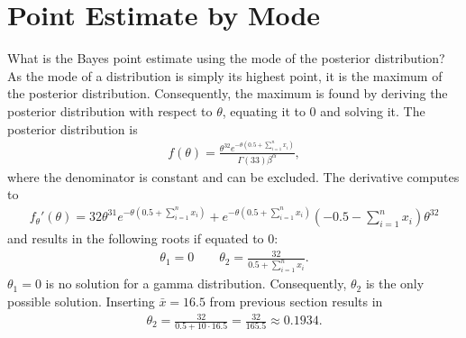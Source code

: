 \section{Point Estimate by Mode}
What is the Bayes point estimate using the mode of the posterior distribution?
As the mode of a distribution is simply its highest point, it is the maximum of the posterior distribution. Consequently, the maximum is found by deriving the posterior distribution with respect to $\theta$, equating it to 0 and solving it. The posterior distribution is
\begin{equation}
\begin{split}
f(\theta) = \frac{\theta^{32}e^{-\theta(0.5+\sum_{i=1}^n x_i)}}
{\Gamma(33)\beta^\alpha},
\end{split}
\label{eq:postdistinserted}
\end{equation}
where the denominator is constant and can be excluded. The derivative computes to
\begin{equation}
\begin{split}
f_\theta'(\theta) = 32\theta^{31}e^{-\theta\left(0.5+\sum_{i=1}^n x_i\right)}+e^{-\theta\left(0.5+\sum_{i=1}^n x_i\right)}\left(-0.5-\sum_{i=1}^n x_i\right)\theta^{32}
\end{split}
\label{eq:postdistderived}
\end{equation}
and results in the following roots if equated to 0:
\begin{equation}
\begin{split}
\theta_1 = 0 \qquad \theta_2 = \frac{32}{0.5+\sum_{i=1}^n x_i}.
\end{split}
\label{eq:roots}
\end{equation}
$\theta_1 = 0$ is no solution for a gamma distribution. Consequently, $\theta_2$ is the only possible solution. Inserting $\bar{x} = 16.5$ from previous section results in 
\begin{equation}
\begin{split}
\theta_2 = \frac{32}{0.5+10\cdot16.5} = \frac{32}{165.5} \approx 0.1934.
\end{split}
\label{eq:rootsN}
\end{equation}
